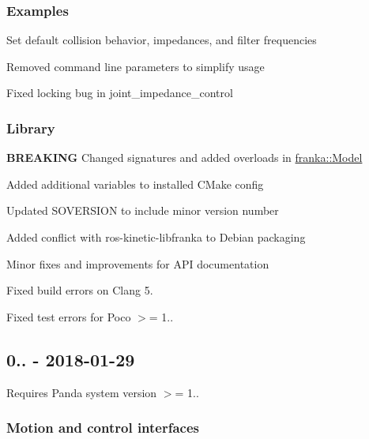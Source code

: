 \subsubsection*{Examples}


\begin{DoxyItemize}
\item Set default collision behavior, impedances, and filter frequencies
\item Removed command line parameters to simplify usage
\item Fixed locking bug in {\ttfamily joint\+\_\+impedance\+\_\+control}
\end{DoxyItemize}

\subsubsection*{Library}


\begin{DoxyItemize}
\item {\bfseries B\+R\+E\+A\+K\+I\+NG} Changed signatures and added overloads in {\ttfamily \hyperlink{classfranka_1_1Model}{franka\+::\+Model}}
\item Added additional variables to installed C\+Make config
\item Updated {\ttfamily S\+O\+V\+E\+R\+S\+I\+ON} to include minor version number
\item Added conflict with {\ttfamily ros-\/kinetic-\/libfranka} to Debian packaging
\item Minor fixes and improvements for A\+PI documentation
\item Fixed build errors on Clang 5.
\item Fixed test errors for Poco $>$= 1..
\end{DoxyItemize}

\subsection*{0.. -\/ 2018-\/01-\/29}

Requires Panda system version $>$= 1..

\subsubsection*{Motion and control interfaces}


